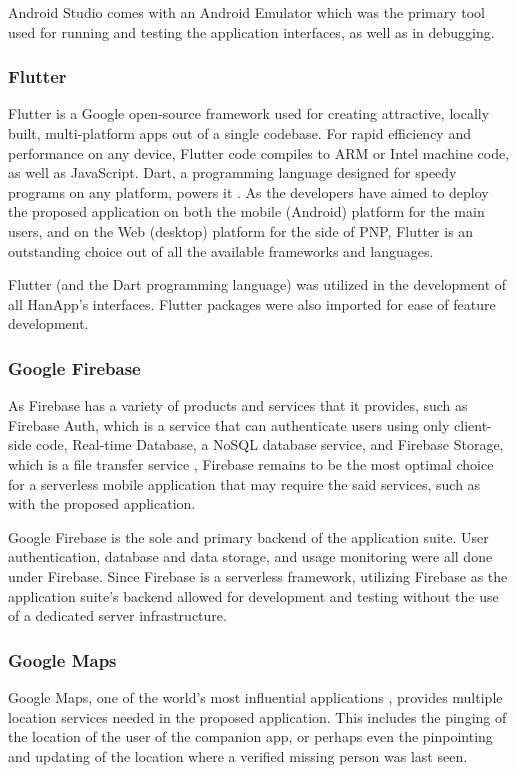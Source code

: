 Android Studio comes with an Android Emulator which was the primary tool used for running and testing the application interfaces, as well as in debugging.

\subsubsection{Flutter}
Flutter is a Google open-source framework used for creating attractive, locally built, multi-platform apps out of a single codebase. For rapid efficiency and performance on any device, Flutter code compiles to ARM or Intel machine code, as well as JavaScript. Dart, a programming language designed for speedy programs on any platform, powers it \cite{flutter}. As the developers have aimed to deploy the proposed application on both the mobile (Android) platform for the main users, and on the Web (desktop)  platform for the side of PNP, Flutter is an outstanding choice out of all the available frameworks and languages.

Flutter (and the Dart programming language) was utilized in the development of all HanApp's interfaces. Flutter packages were also imported for ease of feature development.

\subsubsection{Google Firebase}
As Firebase has a variety of products and services that it provides, such as Firebase Auth, which is a service that can authenticate users using only client-side code, Real-time Database, a NoSQL database service, and Firebase Storage, which is a file transfer service \cite{khawas2018application}, Firebase remains to be the most optimal choice for a serverless mobile application that may require the said services, such as with the proposed application.

Google Firebase is the sole and primary backend of the application suite. User authentication, database and data storage, and usage monitoring were all done under Firebase. Since Firebase is a serverless framework, utilizing Firebase as the application suite's backend allowed for development and testing without the use of a dedicated server infrastructure. 

\subsubsection{Google Maps}
Google Maps, one of the world’s most influential applications \cite{mehta2019google}, provides multiple location services needed in the proposed application. This includes the pinging of the location of the user of the companion app, or perhaps even the pinpointing and updating of the location where a verified missing person was last seen.

